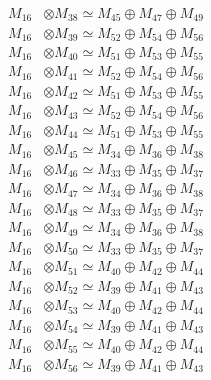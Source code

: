 \begin{align*}
M_{16} &\otimes M_{38} \simeq M_{45} \oplus M_{47} \oplus M_{49} \\
M_{16} &\otimes M_{39} \simeq M_{52} \oplus M_{54} \oplus M_{56} \\
M_{16} &\otimes M_{40} \simeq M_{51} \oplus M_{53} \oplus M_{55} \\
M_{16} &\otimes M_{41} \simeq M_{52} \oplus M_{54} \oplus M_{56} \\
M_{16} &\otimes M_{42} \simeq M_{51} \oplus M_{53} \oplus M_{55} \\
M_{16} &\otimes M_{43} \simeq M_{52} \oplus M_{54} \oplus M_{56} \\
M_{16} &\otimes M_{44} \simeq M_{51} \oplus M_{53} \oplus M_{55} \\
M_{16} &\otimes M_{45} \simeq M_{34} \oplus M_{36} \oplus M_{38} \\
M_{16} &\otimes M_{46} \simeq M_{33} \oplus M_{35} \oplus M_{37} \\
M_{16} &\otimes M_{47} \simeq M_{34} \oplus M_{36} \oplus M_{38} \\
M_{16} &\otimes M_{48} \simeq M_{33} \oplus M_{35} \oplus M_{37} \\
M_{16} &\otimes M_{49} \simeq M_{34} \oplus M_{36} \oplus M_{38} \\
M_{16} &\otimes M_{50} \simeq M_{33} \oplus M_{35} \oplus M_{37} \\
M_{16} &\otimes M_{51} \simeq M_{40} \oplus M_{42} \oplus M_{44} \\
M_{16} &\otimes M_{52} \simeq M_{39} \oplus M_{41} \oplus M_{43} \\
M_{16} &\otimes M_{53} \simeq M_{40} \oplus M_{42} \oplus M_{44} \\
M_{16} &\otimes M_{54} \simeq M_{39} \oplus M_{41} \oplus M_{43} \\
M_{16} &\otimes M_{55} \simeq M_{40} \oplus M_{42} \oplus M_{44} \\
M_{16} &\otimes M_{56} \simeq M_{39} \oplus M_{41} \oplus M_{43} \\
\end{align*}

